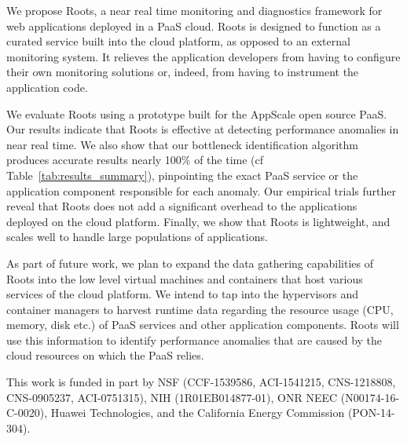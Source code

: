 We propose Roots, a near real time monitoring and diagnostics
framework for web applications deployed in a PaaS cloud. 
Roots is designed to function as a curated service
built into the cloud platform, as opposed to an external monitoring system. 
It relieves the application developers from having to configure
their own monitoring solutions or, indeed,
from having to instrument the application code.


We evaluate Roots using a prototype built for the AppScale open source PaaS. 
Our results indicate that Roots is effective at detecting performance anomalies
in near real time. We also show that our bottleneck identification algorithm
produces accurate results nearly 100\% of the time (cf
Table~\ref{tab:results_summary}), pinpointing the exact PaaS
service or the application component responsible for each anomaly. Our empirical trials further 
reveal that Roots does not add a significant overhead to the applications deployed
on the cloud platform. Finally, we show that Roots is lightweight, 
and scales well to handle large populations of applications. 

As part of future work, we plan to expand the data gathering capabilities of Roots into
the low level virtual machines and containers that host various services of the cloud
platform. We intend to tap into the hypervisors
and container managers to harvest runtime data 
regarding the resource usage (CPU, memory, disk etc.) of
PaaS services and other application components. Roots will use
this information to identify performance anomalies that are caused by
the cloud resources on which the PaaS relies.

\vspace{0.1in}
\noindent
This work is funded in part by NSF (CCF-1539586, ACI-1541215, CNS-1218808, CNS-0905237, ACI-0751315), NIH (1R01EB014877-01), ONR NEEC (N00174-16-C-0020), Huawei Technologies, and the California Energy Commission (PON-14-304).

